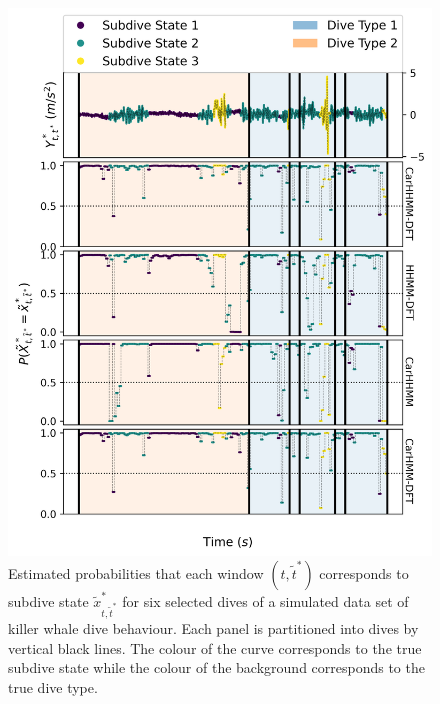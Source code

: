 \begin{figure}[ht]
    \centering
    \includegraphics[width=4.5in]{../Plots/Posterior_Fine_States.png}
    \caption{Estimated probabilities that each window $(t,\tilde t^*)$ corresponds to subdive state $\tilde x^*_{t,\tilde t^*}$ for six selected dives of a simulated data set of killer whale dive behaviour. Each panel is partitioned into dives by vertical black lines. The colour of the curve corresponds to the true subdive state while the colour of the background corresponds to the true dive type.}
    \label{fig:acc_fine}
\end{figure}